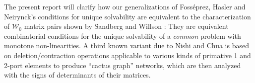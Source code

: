 
The present report will clarify how our 
generalizations of Foss\'{e}prez, Hasler and Neirynck's conditions
for unique solvability
are equivalent to the characterization of $\mathcal{W}_0$ matrix pairs
shown by Sandberg and Willson \cite{SWExistancePf,W0APPLpaper}:
They are equivalent combinatorial 
conditions for the unique solvability
of a \textit{common}
problem with monotone non-linearities.
A third known variant due to Nishi and Chua 
\cite{NishiChuaCactus,NishiChuaCCCS} is based on 
deletion/contraction operations applicable
to various kinds of primative
1 and 2-port elements to produce ``cactus graph'' networks,
which are then analyzed with the signs of determinants 
of their matrices.

